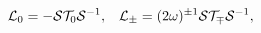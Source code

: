 \begin{equation}
	{\cal L}_{0}=-{\cal S}{\cal T}_{0}{\cal S}^{-1},\;\;\;
	{\cal L}_{\pm}=(2\omega)^{\pm 1}{\cal S}{\cal T}_{\mp}{\cal S}^{-1} ,
\end{equation}

